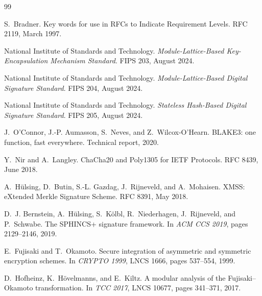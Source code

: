 \documentclass[11pt,a4paper]{article}
\theoremstyle{plain}
\theoremstyle{definition}
\theoremstyle{remark}
\begin{document}
\begin{thebibliography}{99}

S.~Bradner.
\newblock Key words for use in RFCs to Indicate Requirement Levels.
\newblock RFC 2119, March 1997.

National Institute of Standards and Technology.
\newblock \emph{Module-Lattice-Based Key-Encapsulation Mechanism
Standard}. FIPS 203, August 2024.

National Institute of Standards and Technology.
\newblock \emph{Module-Lattice-Based Digital Signature Standard}.
FIPS 204, August 2024.

National Institute of Standards and Technology.
\newblock \emph{Stateless Hash-Based Digital Signature Standard}.
FIPS 205, August 2024.

J.~O'Connor, J.-P. Aumasson, S.~Neves, and Z.~Wilcox-O'Hearn.
\newblock BLAKE3: one function, fast everywhere.
\newblock Technical report, 2020.

Y.~Nir and A.~Langley.
\newblock ChaCha20 and Poly1305 for IETF Protocols.
\newblock RFC 8439, June 2018.

A.~H\"ulsing, D.~Butin, S.-L. Gazdag, J.~Rijneveld, and A.~Mohaisen.
\newblock XMSS: eXtended Merkle Signature Scheme.
\newblock RFC 8391, May 2018.

D.~J. Bernstein, A.~H\"ulsing, S.~K\"olbl, R.~Niederhagen,
J.~Rijneveld, and P.~Schwabe.
\newblock The SPHINCS+ signature framework.
\newblock In \emph{ACM CCS 2019}, pages 2129--2146, 2019.

E.~Fujisaki and T.~Okamoto.
\newblock Secure integration of asymmetric and symmetric encryption
schemes.
\newblock In \emph{CRYPTO 1999}, LNCS 1666, pages 537--554, 1999.

D.~Hofheinz, K.~H\"ovelmanns, and E.~Kiltz.
\newblock A modular analysis of the Fujisaki--Okamoto transformation.
\newblock In \emph{TCC 2017}, LNCS 10677, pages 341--371, 2017.

\end{thebibliography}
\end{document}
